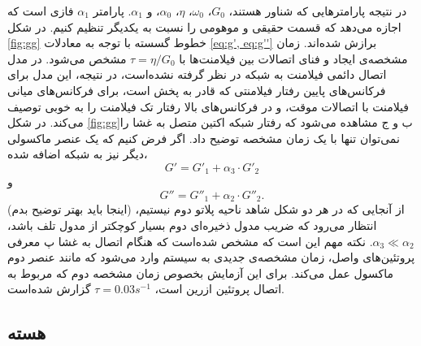 در نتیجه پارامتر‌هایی که شناور هستند، $G_0$، $\omega_0$، $\eta$، $\alpha_0$، و $\alpha_1$. پارامتر $\alpha_1$ فازی است که اجازه می‌دهد که قسمت حقیقی و موهومی را نسبت به یکدیگر تنظیم کنیم. در شکل \ref{fig:gg} خطوط گسسته با توجه به معادلات \ref{eq:g', eq:g''} برازش شده‌اند. زمان مشخصه‌ی ایجاد و فنای اتصالات بین فیلامنت‌ها با $\tau=\eta/G_0$ مشخص می‌شود. در مدل اتصال دائمی‌ فیلامنت به شبکه در نظر گرفته نشده‌است، در نتیجه، این مدل برای فرکانس‌های پایین رفتار فیلامنتی که قادر به پخش است، برای فرکانس‌های میانی فیلامنت با اتصالات موقت، و در فرکانس‌های بالا رفتار تک فیلامنت را به خوبی توصیف می‌کند. در شکل \ref{fig:gg}ب و ج مشاهده می‌شود که رفتار شبکه اکتین متصل به غشا را نمی‌توان تنها با یک زمان مشخصه توضیح داد. اگر فرض کنیم که یک عنصر ماکسولی دیگر نیز به شبکه اضافه شده،
\begin{equation}
G'=G'_1+\alpha_3\cdot G'_2
\label{eq:g'2}
\end{equation}
و
\begin{equation}
G''=G''_1+\alpha_2\cdot G''_2.
\label{eq:g''2}
\end{equation}
(اینجا باید بهتر توضیح بدم) از آنجایی که در هر دو شکل شاهد ناحیه پلاتو دوم نیستیم، انتظار می‌رود که ضریب مدول ذخیره‌ای دوم بسیار کوچکتر از مدول تلف باشد، $\alpha_3\ll\alpha_2$. نکته مهم این است که مشخص شده‌است که هنگام اتصال به غشا پ معرفی پروتئین‌های واصل، زمان مشخصه‌ی جدیدی به سیستم وارد می‌شود که مانند عنصر دوم ماکسول عمل می‌کند. برای این آزمایش بخصوص زمان مشخصه دوم که مربوط به اتصال پروتئین ازرین است، $\tau=0.03 s^{-1}$ گزارش شده‌است. \cite{doi:10.1021/acs.jpcb.7b11491}

\subsection{هسته}\label{lab:nucleus}

